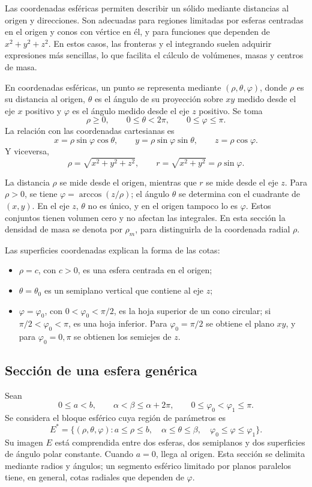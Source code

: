 Las coordenadas esféricas permiten describir un sólido mediante distancias al origen y direcciones. Son adecuadas para regiones limitadas por esferas centradas en el origen y conos con vértice en él, y para funciones que dependen de $x^2+y^2+z^2$. En estos casos, las fronteras y el integrando suelen adquirir expresiones más sencillas, lo que facilita el cálculo de volúmenes, masas y centros de masa.

En coordenadas esféricas, un punto se representa mediante $(\rho,\theta,\varphi)$, donde $\rho$ es su distancia al origen, $\theta$ es el ángulo de su proyección sobre $xy$ medido desde el eje $x$ positivo y $\varphi$ es el ángulo medido desde el eje $z$ positivo. Se toma
\[
\rho\geq0,\qquad 0\leq\theta<2\pi,\qquad 0\leq\varphi\leq\pi.
\]
La relación con las coordenadas cartesianas es
\[
x=\rho\sin\varphi\cos\theta,\qquad
y=\rho\sin\varphi\sin\theta,\qquad z=\rho\cos\varphi.
\]
Y viceversa,
\[
\rho=\sqrt{x^2+y^2+z^2},\qquad
r=\sqrt{x^2+y^2}=\rho\sin\varphi.
\]

La distancia $\rho$ se mide desde el origen, mientras que $r$ se mide desde el eje $z$. Para $\rho>0$, se tiene $\varphi=\arccos(z/\rho)$; el ángulo $\theta$ se determina con el cuadrante de $(x,y)$. En el eje $z$, $\theta$ no es único, y en el origen tampoco lo es $\varphi$. Estos conjuntos tienen volumen cero y no afectan las integrales. En esta sección la densidad de masa se denota por $\rho_m$, para distinguirla de la coordenada radial $\rho$.

Las superficies coordenadas explican la forma de las cotas:
\begin{itemize}
    \item $\rho=c$, con $c>0$, es una esfera centrada en el origen;
    \item $\theta=\theta_0$ es un semiplano vertical que contiene al eje $z$;
    \item $\varphi=\varphi_0$, con $0<\varphi_0<\pi/2$, es la hoja superior de un cono circular; si $\pi/2<\varphi_0<\pi$, es una hoja inferior. Para $\varphi_0=\pi/2$ se obtiene el plano $xy$, y para $\varphi_0=0,\pi$ se obtienen los semiejes de $z$.
\end{itemize}

\subsection{Sección de una esfera genérica}

Sean
\[
0\leq a<b,\qquad \alpha<\beta\leq\alpha+2\pi,
\qquad 0\leq\varphi_0<\varphi_1\leq\pi.
\]
Se considera el bloque esférico cuya región de parámetros es
\[
E^*=\{(\rho,\theta,\varphi):a\leq\rho\leq b,\quad
\alpha\leq\theta\leq\beta,\quad
\varphi_0\leq\varphi\leq\varphi_1\}.
\]
Su imagen $E$ está comprendida entre dos esferas, dos semiplanos y dos superficies de ángulo polar constante. Cuando $a=0$, llega al origen. Esta sección se delimita mediante radios y ángulos; un segmento esférico limitado por planos paralelos tiene, en general, cotas radiales que dependen de $\varphi$.

